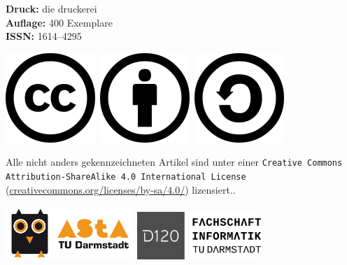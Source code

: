 \vspace{3mm}
\textbf{Druck:} die druckerei\\
\textbf{Auflage:} 400 Exemplare\\
\textbf{ISSN:} 1614–4295

\vspace{3mm}
\begin{minipage}{0.2\textwidth}
    \includegraphics[scale=.3]{grafik/CreativeCommons/cc}~\includegraphics[scale=.3]{grafik/CreativeCommons/by}~\includegraphics[scale=.3]{grafik/CreativeCommons/sa}
\end{minipage}
\begin{minipage}{0.8\textwidth}
    Alle nicht anders gekennzeichneten Artikel sind unter einer \texttt{Creative Commons
        Attribution-ShareAlike 4.0 International License}
    (\url{creativecommons.org/licenses/by-sa/4.0/}) lizensiert..
\end{minipage}

\vspace{3mm}
\includegraphics[height=20mm]{grafik/eule_final_orange} \hspace{8mm}
\includegraphics[height=18mm]{grafik/logo_ohne_rand}

\pagebreak
